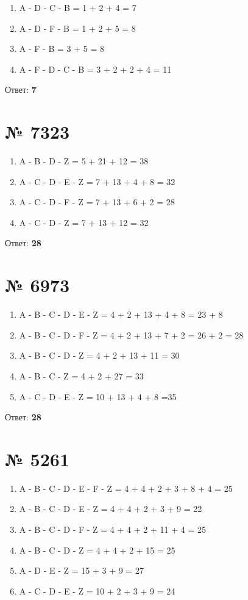 \documentclass[11pt]{article} %
\begin{document}
\begin{enumerate}
	\item A - D - C - B = 1 + 2 + 4 = 7
	\item A - D - F - B = 1 + 2 + 5 = 8
	\item A - F - B = 3 + 5 = 8
	\item A - F - D - C - B = 3 + 2 + 2 + 4 = 11
\end{enumerate}

Ответ: \textbf{7}

\section{№ \textbf{7323}}

\begin{enumerate}
	\item A - B - D - Z = 5 + 21 + 12 = 38
	\item A - C - D - E - Z = 7 + 13 + 4 + 8  = 32
	\item A - C - D - F - Z = 7 + 13 + 6 + 2 = 28
	\item A - C - D - Z = 7 + 13 + 12 = 32
\end{enumerate}

Ответ: \textbf{28}

\section{№ \textbf{6973}}

\begin{enumerate}
	\item A - B - C - D - E - Z = 4 + 2 + 13 + 4 + 8  = 23 + 8
	\item A - B - C - D - F - Z = 4 + 2 + 13 + 7 + 2 = 26 + 2 = 28
	\item A - B - C - D - Z = 4 + 2 + 13 + 11 = 30
	\item A - B - C - Z = 4 + 2 + 27 = 33
	\item A - C - D - E - Z = 10 + 13 + 4 + 8 =35
\end{enumerate}

Ответ: \textbf{28}

\section{№ \textbf{5261}}

\begin{enumerate}
	\item A - B - C - D - E - F - Z = 4 + 4 + 2 + 3 + 8 + 4 = 25 
	\item A - B - C - D - E - Z = 4 + 4 + 2 + 3 + 9 = 22
	\item A - B - C - D - F - Z = 4 + 4 + 2 + 11 + 4 = 25
	\item A - B - C - D - Z = 4 + 4 + 2 + 15 = 25
	\item A - D - E - Z = 15 + 3 + 9 = 27
	\item A - C - D - E - Z = 10 + 2 + 3 + 9 = 24
\end{enumerate}
\end{document}

